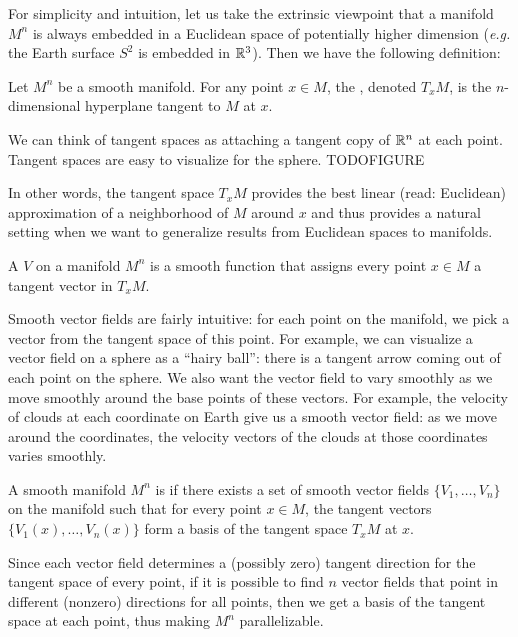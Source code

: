 \documentclass[12pt]{article}
\begin{document}
For simplicity and intuition, let us take the extrinsic viewpoint that a manifold $ M^{n}$ is always embedded in a Euclidean space of potentially higher dimension (\emph{e.g.} the Earth surface $ S^2$ is embedded in $ \mathbb{R}^3$). Then we have the following definition:
\begin{defn}
Let $ M^{n}$ be a smooth manifold. For any point $ x \in M$, the , denoted $ T_xM$, is the $ n$-dimensional hyperplane tangent to  $ M$ at  $ x$.
\end{defn}
We can think of tangent spaces as attaching a tangent copy of $ \mathbb{R}^{n}$ at each point. Tangent spaces are easy to visualize for the sphere. TODOFIGURE

In other words, the tangent space $ T_xM$ provides the best linear (read: Euclidean) approximation of a neighborhood of $ M$ around $ x$ and thus provides a natural setting when we want to generalize results from Euclidean spaces to manifolds.
\begin{defn}
	A  $ V$ on a manifold $ M^{n}$ is a smooth function that assigns every point $ x \in M$ a tangent vector in $ T_x M$.
\end{defn}
Smooth vector fields are fairly intuitive: for each point on the manifold, we pick a vector from the tangent space of this point. For example, we can visualize a vector field on a sphere as a ``hairy ball'': there is a tangent arrow coming out of each point on the sphere. We also want the vector field to vary smoothly as we move smoothly around the base points of these vectors. For example, the velocity of clouds at each coordinate on Earth give us a smooth vector field: as we move around the coordinates, the velocity vectors of the clouds at those coordinates varies smoothly. 
\begin{defn}
A smooth manifold $ M^{n}$ is  if there exists a set of smooth vector fields $ \{V_1,\ldots,V_n\} $ on the manifold such that for every point $ x \in M$, the tangent vectors $ \{V_1(x),\ldots,V_n(x)\} $ form a basis of the tangent space $ T_xM$ at $ x$.
\end{defn}

Since each vector field determines a (possibly zero) tangent direction for the tangent space of every point, if it is possible to find $ n$ vector fields that point in different (nonzero) directions for all points, then we get a basis of the tangent space at each point, thus making  $ M^{n}$ parallelizable.
\end{document}
